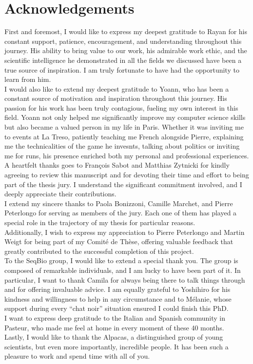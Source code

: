 \section*{Acknowledgements}
First and foremost, I would like to express my deepest gratitude to Rayan for his constant support, patience, encouragement, and understanding throughout this journey. His ability to bring value to our work, his admirable work ethic, and the scientific intelligence he demonstrated in all the fields we discussed have been a true source of inspiration. I am truly fortunate to have had the opportunity to learn from him.\\
I would also like to extend my deepest gratitude to Yoann, who has been a constant source of motivation and inspiration throughout this journey. His passion for his work has been truly contagious, fueling my own interest in this field. Yoann not only helped me significantly improve my computer science skills but also became a valued person in my life in Paris. Whether it was inviting me to events at La Treso, patiently teaching me French alongside Pierre, explaining me the technicalities of the game he invesnts, talking about politics or inviting me for runs, his presence enriched both my personal and professional experiences.\\
A heartfelt thanks goes to François Sabot and Matthias Zytnicki for kindly agreeing to review this manuscript and for devoting their time and effort to being part of the thesis jury. I understand the significant commitment involved, and I deeply appreciate their contributions.\\
I extend my sincere thanks to Paola Bonizzoni, Camille Marchet, and Pierre Peterlongo for serving as members of the jury. Each one of them has played a special role in the trajectory of my thesis for particular reasons.\\
Additionally, I wish to express my appreciation to Pierre Peterlongo and Martin Weigt for being part of my Comité de Thèse, offering valuable feedback that greatly contributed to the successful completion of this project.\\
To the SeqBio group, I would like to extend a special thank you. The group is composed of remarkable individuals, and I am lucky to have been part of it. In particular, I want to thank Camila for always being there to talk things through and for offering invaluable advice. I am equally grateful to Yoshihiro for his kindness and willingness to help in any circumstance and to Mélanie, whose support during every “chat noir” situation ensured I could finish this PhD.\\
I want to express deep gratitude to the Italian and Spanish community in Pasteur, who made me feel at home in every moment of these 40 months.\\
Lastly, I would like to thank the Alpacas, a distinguished group of young scientists, but even more importantly, incredible people. It has been such a pleasure to work and spend time with all of you.\\

